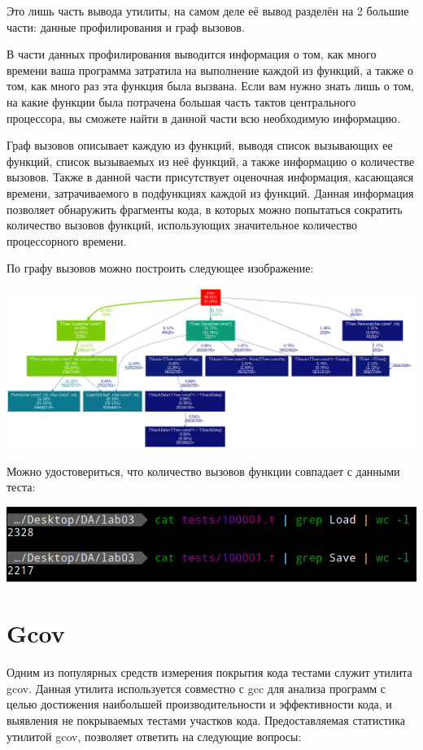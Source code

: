\documentclass[12pt]{article}
\begin{document}
Это лишь часть вывода утилиты, на самом деле её вывод разделён на 2 большие части: данные профилирования и граф вызовов.


В части данных профилирования выводится информация о том, как много времени ваша программа затратила на выполнение каждой из функций, а также о том, как много раз эта функция была вызвана. Если вам нужно знать лишь о том, на какие функции была потрачена большая часть тактов центрального процессора, вы сможете найти в данной части всю необходимую информацию.

Граф вызовов описывает каждую из функций, выводя список вызывающих ее функций, список вызываемых из неё функций, а также информацию о количестве вызовов. Также в данной части присутствует оценочная информация, касающаяся времени, затрачиваемого в подфункциях каждой из функций. Данная информация позволяет обнаружить фрагменты кода, в которых можно попытаться сократить количество вызовов функций, использующих значительное количество процессорного времени.

По графу вызовов можно построить следующее изображение:

\includegraphics[scale=0.317]{outt.png}

\noindent Можно удостовериться, что количество вызовов функции совпадает с данными теста:

\includegraphics[scale=0.9]{tst.png}

\section*{Gcov}

Одним из популярных средств измерения покрытия кода тестами служит утилита gcov. Данная утилита используется совместно с gcc для анализа программ с целью достижения наибольшей производительности и эффективности кода, и выявления не покрываемых тестами участков кода. Предоставляемая статистика утилитой gcov, позволяет ответить на следующие вопросы:
\end{document}
